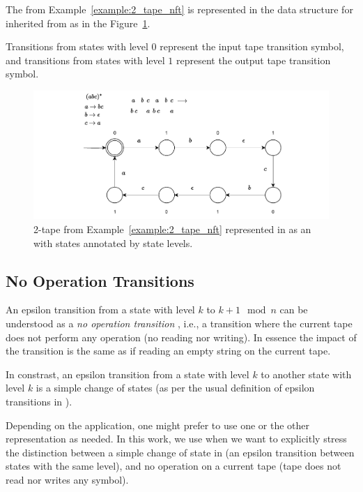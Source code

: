 \begin{example}\label{example:2_tape_nft_in_mata}
  The \nft from Example~\ref{example:2_tape_nft} is represented in the data structure for \nfts inherited from \nfaClass as in the Figure~\ref{fig:2_tape_nft_in_mata}.

  Transitions from states with level $0$ represent the input tape transition symbol, and transitions from states with level $1$ represent the output tape transition symbol.

  \begin{figure}[ht]
    \centering
    \includegraphics[scale=1.0,keepaspectratio]{obrazky-figures/transducer_in_mata.drawio.pdf}
    \caption{
      2-tape \nft from Example~\ref{example:2_tape_nft} represented in \mata as an \nfaClass with states annotated by state levels.
    }\label{fig:2_tape_nft_in_mata}
  \end{figure}
\end{example}

\subsection{No Operation Transitions}
An epsilon transition from a state with level $k$ to $k+1 \mod n$ can be understood as a \emph{no operation transition} \nop, i.e., a transition where the current tape does not perform any operation (no reading nor writing). In essence the impact of the transition is the same as if reading an empty string on the current tape.

In constrast, an epsilon transition from a state with level $k$ to another state with level $k$ is a simple change of states (as per the usual definition of epsilon transitions in \nfas).

Depending on the application, one might prefer to use one or the other representation as needed.
In this work, we use \nop when we want to explicitly stress the distinction between a simple change of state in \nft (an epsilon transition between states with the same level), and no operation on a current tape (tape does not read nor writes any symbol).

